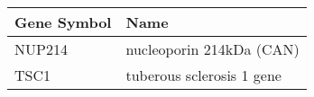 \begin{tabular}{ll}
\toprule
Gene Symbol &                      Name \\
\midrule
     NUP214 &  nucleoporin 214kDa (CAN) \\
       TSC1 & tuberous sclerosis 1 gene \\
\bottomrule
\end{tabular}
